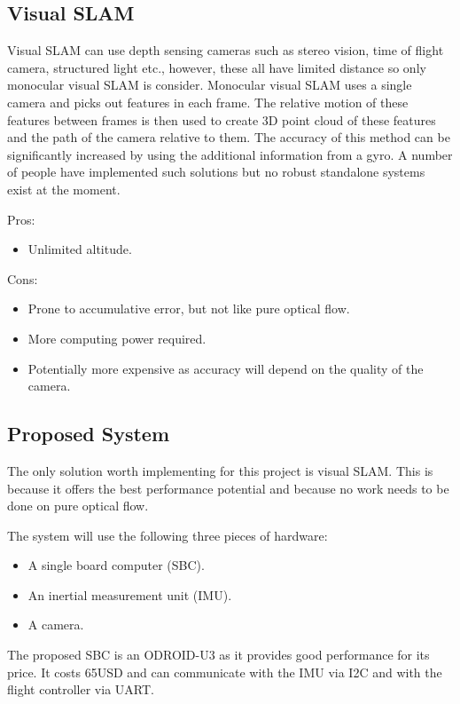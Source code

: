 \documentclass[a4paper,12pt]{article}
\begin{document}
\subsection{Visual SLAM}
Visual SLAM can use depth sensing cameras such as stereo vision, time of flight camera, structured light etc., however, these all have limited distance so only monocular visual SLAM is consider. Monocular visual SLAM uses a single camera and picks out features in each frame. The relative motion of these features between frames is then used to create 3D point cloud of these features and the path of the camera relative to them. The accuracy of this method can be significantly increased by using the additional information from a gyro. A number of people have implemented such solutions but no robust standalone systems exist at the moment.

Pros:
\begin{itemize}
	\item Unlimited altitude.
\end{itemize}
Cons:
\begin{itemize}
	\item Prone to accumulative error, but not like pure optical flow.
	\item More computing power required.
	\item Potentially more expensive as accuracy will depend on the quality of the camera.
\end{itemize}

\subsection{Proposed System\label{system}}
The only solution worth implementing for this project is visual SLAM. This is because it offers the best performance potential and because no work needs to be done on pure optical flow.

The system will use the following three pieces of hardware:
\begin{itemize}
	\item A single board computer (SBC).
	\item An inertial measurement unit (IMU).
	\item A camera.
\end{itemize}

The proposed SBC is an ODROID-U3 as it provides good performance for its price. It costs 65USD and can communicate with the IMU via I2C and with the flight controller via UART.
\end{document}
